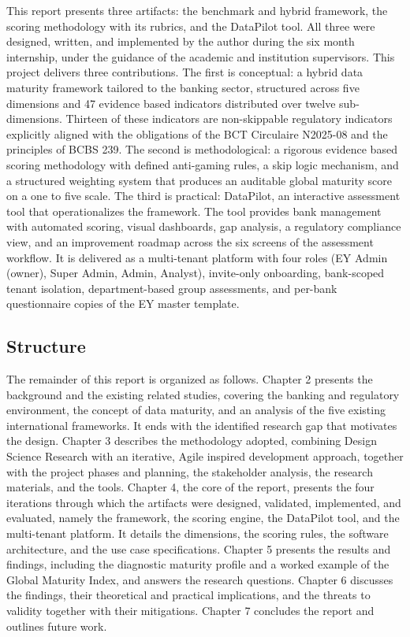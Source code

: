 This report presents three artifacts: the benchmark and hybrid framework, the scoring methodology with its rubrics, and the DataPilot tool. All three were designed, written, and implemented by the author during the six month internship, under the guidance of the academic and institution supervisors. This project delivers three contributions. The first is conceptual: a hybrid data maturity framework tailored to the banking sector, structured across five dimensions and 47 evidence based indicators distributed over twelve sub-dimensions. Thirteen of these indicators are non-skippable regulatory indicators explicitly aligned with the obligations of the BCT Circulaire N\textdegree{}2025-08 and the principles of BCBS 239. The second is methodological: a rigorous evidence based scoring methodology with defined anti-gaming rules, a skip logic mechanism, and a structured weighting system that produces an auditable global maturity score on a one to five scale. The third is practical: DataPilot, an interactive assessment tool that operationalizes the framework. The tool provides bank management with automated scoring, visual dashboards, gap analysis, a regulatory compliance view, and an improvement roadmap across the six screens of the assessment workflow. It is delivered as a multi-tenant platform with four roles (EY Admin (owner), Super Admin, Admin, Analyst), invite-only onboarding, bank-scoped tenant isolation, department-based group assessments, and per-bank questionnaire copies of the EY master template.

\subsection{Structure}

The remainder of this report is organized as follows. Chapter 2 presents the background and the existing related studies, covering the banking and regulatory environment, the concept of data maturity, and an analysis of the five existing international frameworks. It ends with the identified research gap that motivates the design. Chapter 3 describes the methodology adopted, combining Design Science Research with an iterative, Agile inspired development approach, together with the project phases and planning, the stakeholder analysis, the research materials, and the tools. Chapter 4, the core of the report, presents the four iterations through which the artifacts were designed, validated, implemented, and evaluated, namely the framework, the scoring engine, the DataPilot tool, and the multi-tenant platform. It details the dimensions, the scoring rules, the software architecture, and the use case specifications. Chapter 5 presents the results and findings, including the diagnostic maturity profile and a worked example of the Global Maturity Index, and answers the research questions. Chapter 6 discusses the findings, their theoretical and practical implications, and the threats to validity together with their mitigations. Chapter 7 concludes the report and outlines future work.

